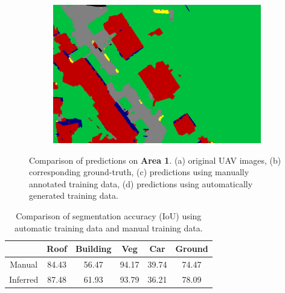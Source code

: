 \begin{figure}[htb]
\begin{subfigure}{0.243\columnwidth}
  \caption{}
\end{subfigure}
\begin{subfigure}{0.243\columnwidth}
  \centering
  \includegraphics[width=1\linewidth]{fig/segmentation/DSC00855_6000_autocrf.png}
  \caption{}
\end{subfigure}

\caption{Comparison of predictions on \textbf{Area 1}. (a) original UAV images, (b) corresponding ground-truth, (c) predictions using manually annotated training data, (d) predictions using automatically generated training data.}
\label{fig:seg_ei}
\end{figure}



\begin{table}[htb]
\centering
\caption{Comparison of segmentation accuracy (IoU) using automatic training data and manual training data.}
\label{seg}
    \begin{tabular}{cccccc}
    \toprule
    \textbf{} & \textbf{Roof} & \textbf{Building} & \textbf{Veg} & \textbf{Car} & \textbf{Ground} \\
          
    \midrule

Manual    &  84.43 &     56.47 & 94.17  & 39.74 & 74.47\\
Inferred &   87.48 &   61.93   &    93.79  & 36.21& 78.09\\
\bottomrule
\end{tabular}
\end{table}

